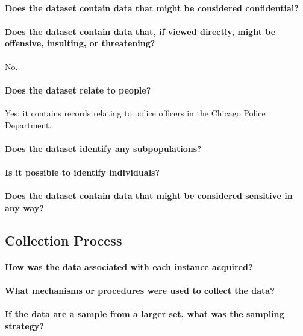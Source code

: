 \paragraph{Does the dataset contain data that might be considered confidential?}

\paragraph{Does the dataset contain data that, if viewed directly, might be offensive, insulting, or threatening?}
No.

\paragraph{Does the dataset relate to people?} 
Yes; it contains records relating to police officers in the Chicago Police Department.

\paragraph{Does the dataset identify any subpopulations?}

\paragraph{Is it possible to identify individuals?}

\paragraph{Does the dataset contain data that might be considered sensitive in any way?}

\subsection{Collection Process}

\paragraph{How was the data associated with each instance acquired?}

\paragraph{What mechanisms or procedures were used to collect the data?}

\paragraph{If the data are a sample from a larger set, what was the sampling strategy?}

